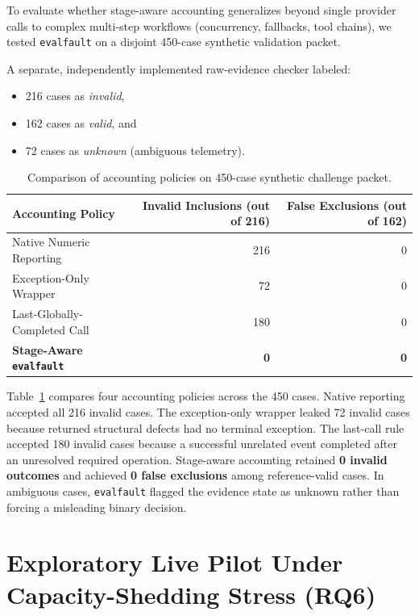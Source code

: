 To evaluate whether stage-aware accounting generalizes beyond single provider calls to complex multi-step workflows (concurrency, fallbacks, tool chains), we tested \texttt{evalfault} on a disjoint 450-case synthetic validation packet.

A separate, independently implemented raw-evidence checker labeled:
\begin{itemize}
    \item 216 cases as \textit{invalid},
    \item 162 cases as \textit{valid}, and
    \item 72 cases as \textit{unknown} (ambiguous telemetry).
\end{itemize}

\begin{table}[!t]
\centering
\caption{Comparison of accounting policies on 450-case synthetic challenge packet.}
\label{tab:accounting-policies}
\footnotesize
\begin{tabular}{@{}lrr@{}}
\toprule
Accounting Policy & Invalid Inclusions (out of 216) & False Exclusions (out of 162) \\
\midrule
Native Numeric Reporting & 216 & 0 \\
Exception-Only Wrapper & 72 & 0 \\
Last-Globally-Completed Call & 180 & 0 \\
\textbf{Stage-Aware \texttt{evalfault}} & \textbf{0} & \textbf{0} \\
\bottomrule
\end{tabular}
\end{table}

Table~\ref{tab:accounting-policies} compares four accounting policies across the 450 cases. Native reporting accepted all 216 invalid cases. The exception-only wrapper leaked 72 invalid cases because returned structural defects had no terminal exception. The last-call rule accepted 180 invalid cases because a successful unrelated event completed after an unresolved required operation. Stage-aware accounting retained \textbf{0 invalid outcomes} and achieved \textbf{0 false exclusions} among reference-valid cases. In ambiguous cases, \texttt{evalfault} flagged the evidence state as unknown rather than forcing a misleading binary decision.

\section{Exploratory Live Pilot Under Capacity-Shedding Stress (RQ6)}\label{sec:live-pilot}

